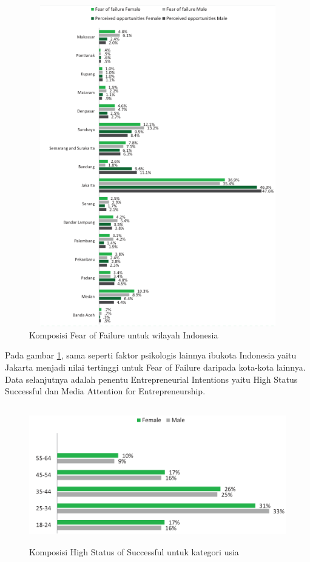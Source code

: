 \begin{figure} [H]
	\centering  
	\includegraphics[width=12cm, height=14cm]{lokasiFF2013} 
	\caption[Komposisi Fear of Failure untuk wilayah Indonesia]{Komposisi Fear of Failure untuk wilayah Indonesia} 
	\label{fig:lokasiFF} 
\end{figure} 

Pada gambar \ref{fig:lokasiFF}, sama seperti faktor psikologis lainnya ibukota Indonesia yaitu Jakarta menjadi nilai tertinggi untuk Fear of Failure daripada kota-kota lainnya. Data selanjutnya adalah penentu Entrepreneurial Intentions yaitu High Status Successful dan Media Attention for Entrepreneurship.

\begin{figure} [H]
	\centering  
	\includegraphics[width=14cm, height=6cm]{umurHS2013} 
	\caption[Komposisi High Status of Successful untuk kategori usia]{Komposisi High Status of Successful untuk kategori usia} 
	\label{fig:umurHS} 
\end{figure} 

